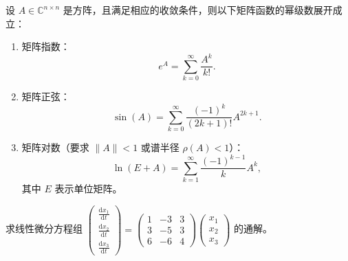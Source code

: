 \begin{lemma}[矩阵级数展开]
设 \(A \in \mathbb{C}^{n \times n}\) 是方阵，且满足相应的收敛条件，则以下矩阵函数的幂级数展开成立：
\begin{enumerate}
    \item 矩阵指数：
    \[
    e^{A} = \sum_{k=0}^{\infty} \frac{A^k}{k!}.
    \]

    \item 矩阵正弦：
    \[
    \sin(A) = \sum_{k=0}^{\infty} \frac{(-1)^k}{(2k+1)!} A^{2k+1}.
    \]

    \item 矩阵对数（要求 \(\|A\| < 1\) 或谱半径 \(\rho(A) < 1\)）：
    \[
    \ln(E + A) = \sum_{k=1}^{\infty} \frac{(-1)^{k-1}}{k} A^k,
    \]
    其中 \(E\) 表示单位矩阵。
\end{enumerate}
\end{lemma}


\begin{example}
求线性微分方程组
$
\begin{pmatrix}
\frac{\mathrm{d}x_1}{\mathrm{d} t} \\\frac{\mathrm{d}x_2}{\mathrm{d} t} \\\frac{\mathrm{d}x_3}{\mathrm{d} t}
\end{pmatrix}=
\begin{pmatrix}
1&-3&3\\
3&-5&3\\
6&-6&4
\end{pmatrix} 
\begin{pmatrix}
x_1\\x_2\\x_3
\end{pmatrix}
$               的通解。
\end{example}


